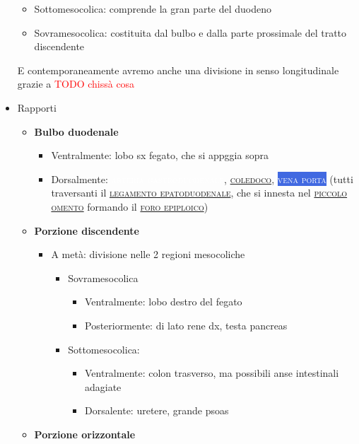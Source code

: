 \documentclass[italian,]{article}
\providecommand{\tightlist}{%
  \setlength{\itemsep}{0pt}\setlength{\parskip}{0pt}}
\newcommand{\ven}[1]{\colorbox{RoyalBlue}{\textcolor{white}{\textsc{#1}}}}
\newcommand{\art}[1]{\colorbox{RedOrange}{\textcolor{white}{\textsc{#1}}}}
\renewcommand{\a}[1]{\underline{\textsc{#1}}}
\newcommand{\TODO}[1]{\textcolor{red}{\textsf{\footnotesize{TODO #1}}}} %
\begin{document}
\begin{itemize}
  \begin{itemize}
  \tightlist
  \item
    Sottomesocolica: comprende la gran parte del duodeno
  \item
    Sovramesocolica: costituita dal bulbo e dalla parte prossimale del
    tratto discendente
  \end{itemize}

  E contemporaneamente avremo anche una divisione in senso longitudinale
  grazie a \TODO{chissà cosa}
\item
  Rapporti

  \begin{itemize}
  \tightlist
  \item
    \textbf{Bulbo duodenale}

    \begin{itemize}
    \tightlist
    \item
      Ventralmente: lobo sx fegato, che si appggia sopra
    \item
      Dorsalmente: \art{arteria gastroduodenale}, \a{coledoco},
      \ven{vena porta} (tutti traversanti il
      \a{legamento epatoduodenale}, che si innesta nel
      \a{piccolo omento} formando il \a{foro epiploico})
    \end{itemize}
  \item
    \textbf{Porzione discendente}

    \begin{itemize}
    \tightlist
    \item
      A metà: divisione nelle 2 regioni mesocoliche

      \begin{itemize}
      \tightlist
      \item
        Sovramesocolica

        \begin{itemize}
        \tightlist
        \item
          Ventralmente: lobo destro del fegato
        \item
          Posteriormente: di lato rene dx, testa pancreas
        \end{itemize}
      \item
        Sottomesocolica:

        \begin{itemize}
        \tightlist
        \item
          Ventralmente: colon trasverso, ma possibili anse intestinali
          adagiate
        \item
          Dorsalente: uretere, grande psoas
        \end{itemize}
      \end{itemize}
    \end{itemize}
  \item
    \textbf{Porzione orizzontale}


\end{itemize}
\end{itemize}
\end{document}
